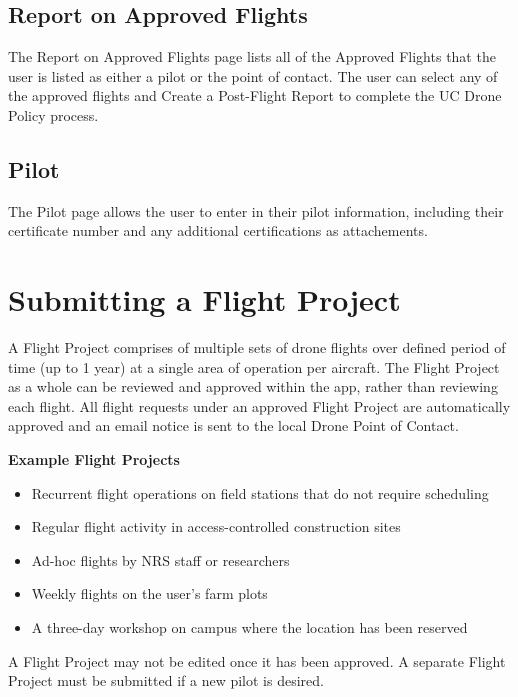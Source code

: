 \documentclass[
  12pt,
]{book}
\providecommand{\tightlist}{%
  \setlength{\itemsep}{0pt}\setlength{\parskip}{0pt}}
\begin{document}
\subsection{Report on Approved Flights}\label{report-on-approved-flights}

The Report on Approved Flights page lists all of the Approved Flights that the user is listed as either a pilot or the point of contact. The user can select any of the approved flights and Create a Post-Flight Report to complete the UC Drone Policy process.

\subsection{Pilot}\label{UCDrones-pilot}

The Pilot page allows the user to enter in their pilot information, including their certificate number and any additional certifications as attachements.

\section{Submitting a Flight Project}\label{UCDrones-project}

A Flight Project comprises of multiple sets of drone flights over defined period of time (up to 1 year) at a single area of operation per aircraft. The Flight Project as a whole can be reviewed and approved within the app, rather than reviewing each flight. All flight requests under an approved Flight Project are automatically approved and an email notice is sent to the local Drone Point of Contact.

\textbf{Example Flight Projects}

\begin{itemize}
\tightlist
\item
  Recurrent flight operations on field stations that do not require scheduling
\item
  Regular flight activity in access-controlled construction sites
\item
  Ad-hoc flights by NRS staff or researchers
\item
  Weekly flights on the user's farm plots
\item
  A three-day workshop on campus where the location has been reserved
\end{itemize}

A Flight Project may not be edited once it has been approved. A separate Flight Project must be submitted if a new pilot is desired.
\end{document}
